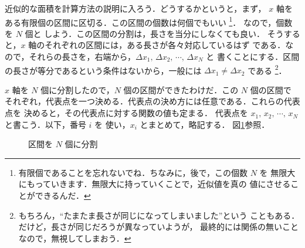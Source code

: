                 近似的な面積を計算方法の説明に入ろう．どうするかというと，まず，
                $x$ 軸をある有限個の区間に区切る．この区間の個数は何個でもいい
                    \footnote{
                        有限個であることを忘れないでね．ちなみに，後で，この個数 $N$ を
                        無限大にもっていきます．無限大に持っていくことで，近似値を真の
                        値にさせることができるんだ．
                    }．
                なので，個数を $N$ 個と
                しよう．この区間の分割は，長さを当分にしなくても良い．
                そうすると，$x$ 軸のそれぞれの区間には，ある長さが各々対応しているはず
                である．なので，それらの長さを，右端から，$\Delta x_{1},\,\Delta x_{2},\,\cdots,\,\Delta x_{N}$ と
                書くことにする．区間の長さが等分であるという条件はないから，一般には
                $\Delta x_{1} \neq \Delta x_{2}$ である
                    \footnote{
                        もちろん，“たまたま長さが同じになってしまいました”という
                        こともある．だけど，長さが同じだろうが異なっていようが，
                        最終的には関係の無いことなので，無視してしまおう．
                    }．

                $x$ 軸を $N$ 個に分割したので，$N$ 個の区間ができたわけだ．この $N$ 個の区間で
                それぞれ，代表点を一つ決める．代表点の決め方には任意である．これらの代表点を
                決めると，その代表点に対する関数の値も定まる．
                代表点を $x_{1},\,x_{2},\,\cdots,\,x_{N}$ と書こう．以下，番号 $i$ を
                使い，$x_{i}$ とまとめて，略記する．
                図\ref{fig:INTEG_LIM00}参照．
                    \begin{figure}[hbt]
                        \begin{center}
                            \caption{区間を $N$ 個に分割}
                            \label{fig:INTEG_LIM00}
                        \end{center}
                    \end{figure}

